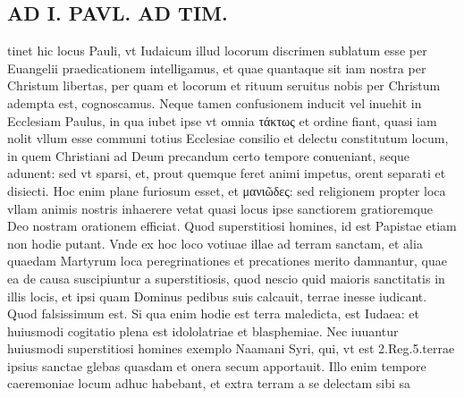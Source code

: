 \documentclass{article}
\begin{document}
\begin{pages}
\section*{AD I. PAVL. AD TIM. }
\marginpar{[ p.68 ]}\pstart tinet hic locus Pauli, vt Iudaicum illud locorum discrimen sublatum esse per Euangelii praedicationem intelligamus, et quae quantaque sit iam nostra per Christum libertas, per quam et locorum et rituum seruitus nobis per Christum adempta est, cognoscamus.  \pend\pstart Neque tamen confusionem inducit vel inuehit in Ecclesiam Paulus, in qua iubet ipse vt omnia τάκτως et ordine fiant, quasi iam nolit vllum esse communi totius Ecclesiae consilio et delectu constitutum locum, in quem Christiani ad Deum precandum certo tempore conueniant, seque adunent: sed vt sparsi, et, prout quemque feret animi impetus, orent separati et disiecti. Hoc enim plane furiosum esset, et μανιῶδες: sed religionem propter loca vllam animis nostris inhaerere vetat quasi locus ipse sanctiorem gratioremque Deo nostram orationem efficiat. Quod superstitiosi homines, id est Papistae etiam non hodie putant.  \pend\pstart Vnde ex hoc loco votiuae illae ad terram sanctam, et alia quaedam Martyrum loca peregrinationes et precationes merito damnantur, quae ea de causa suscipiuntur a superstitiosis, quod nescio quid maioris sanctitatis in illis locis, et ipsi quam Dominus pedibus suis calcauit, terrae inesse iudicant. Quod falsissimum est. Si qua enim hodie est terra maledicta, est Iudaea: et huiusmodi cogitatio plena est idololatriae et blasphemiae. Nec iuuantur huiusmodi superstitiosi homines exemplo Naamani Syri, qui, vt est 2.Reg.5.terrae ipsius sanctae glebas quasdam et onera secum apportauit. Illo enim tempore caeremoniae locum adhuc habebant, et extra terram a se delectam sibi sa\pend

\end{pages}
\end{document}
